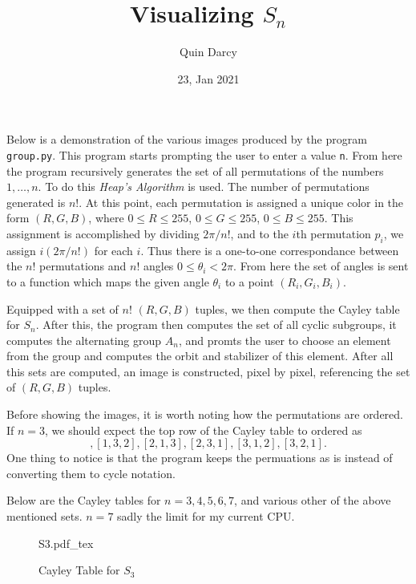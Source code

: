 \documentclass[12pt]{article}
\newcommand{\incfig}[1]{%
    \def\svgwidth{\columnwidth}
    {#1.pdf_tex}
}
\theoremstyle{definition}
\theoremstyle{definition}
\begin{document}
\title{Visualizing $S_n$}
\author{Quin Darcy}
\date{23, Jan 2021}
\maketitle
    Below is a demonstration of the various images produced by the program
    \texttt{group.py}. This program starts prompting the user to enter a value
    \texttt{n}. From here the program recursively generates the set of all
    permutations of the numbers $1,\dots, n$. To do this \textit{Heap's
    Algorithm} is used. The number of permutations generated is $n!$. At this
    point, each permutation is assigned a unique color in the form $(R, G, B)$,
    where $0\leq R\leq 255$, $0\leq G\leq 255$, $0\leq B\leq 255$. This
    assignment is accomplished by  dividing $2\pi/n!$, and to
    the $i$th permutation $p_i$, we assign $i(2\pi/n!)$ for each $i$. Thus
    there is a one-to-one correspondance between the $n!$ permutations and $n!$
    angles $0\leq\theta_i<2\pi$. From here the set of angles is sent to
    a function which maps the given angle $\theta_i$ to a point $(R_i, G_i,
    B_i)$.\par\hspace{4mm} Equipped with a set of $n!$ $(R, G, B)$ tuples, we
    then compute the Cayley table for $S_n$. After this, the program then
    computes the set of all cyclic subgroups, it computes the alternating group
    $A_n$, and promts the user to choose an element from the group and computes
    the orbit and stabilizer of this element. After all this sets are computed,
    an image is constructed, pixel by pixel, referencing the set of $(R, G, B)$
    tuples. \par\hspace{4mm} Before showing the images, it is worth noting how
    the permutations are ordered. If $n=3$, we should expect the top row of the
    Cayley table to ordered as
      \begin{equation*}
        [1, 2, 3], [1, 3, 2], [2, 1, 3], [2, 3, 1], [3, 1, 2], [3, 2, 1].
      \end{equation*}
    One thing to notice is that the program keeps the permuations as is instead
    of converting them to cycle notation.\par\hspace{4mm} Below are the Cayley
    tables for $n=3,4,5, 6, 7$, and various other of the above mentioned
    sets. $n = 7$ sadly the limit for my current
    CPU.
      \begin{figure}[htp!]
        \centering
          \incfig{S3}
          \caption{Cayley Table for $S_3$}
          \label{fig:orb}
      \end{figure}
\end{document}
